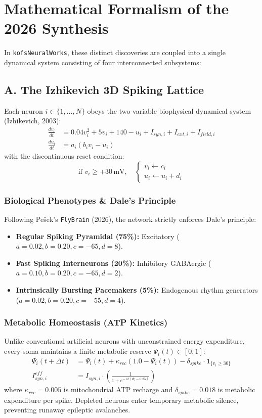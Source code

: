 \documentclass[10pt,twocolumn,a4paper]{article}
\begin{document}
\section{Mathematical Formalism of the 2026 Synthesis}

In \texttt{kofsNeuralWorks}, these distinct discoveries are coupled into a single dynamical system consisting of four interconnected subsystems:

\subsection{A. The Izhikevich 3D Spiking Lattice}
Each neuron $i \in \{1, \dots, N\}$ obeys the two-variable biophysical dynamical system (Izhikevich, 2003):
\begin{align}
\frac{dv_i}{dt} &= 0.04 v_i^2 + 5 v_i + 140 - u_i + I_{syn, i} + I_{ext, i} + I_{field, i} \\
\frac{du_i}{dt} &= a_i (b_i v_i - u_i)
\end{align}
with the discontinuous reset condition:
\begin{equation}
\text{if } v_i \ge +30\,\text{mV}, \quad \begin{cases} v_i \leftarrow c_i \\ u_i \leftarrow u_i + d_i \end{cases}
\end{equation}

\subsubsection{Biological Phenotypes \& Dale's Principle}
Following Pe\v{s}ek's \texttt{FlyBrain} (2026), the network strictly enforces Dale's principle:
\begin{itemize}
    \item \textbf{Regular Spiking Pyramidal (75\%):} Excitatory ($a=0.02, b=0.20, c=-65, d=8$).
    \item \textbf{Fast Spiking Interneurons (20\%):} Inhibitory GABAergic ($a=0.10, b=0.20, c=-65, d=2$).
    \item \textbf{Intrinsically Bursting Pacemakers (5\%):} Endogenous rhythm generators ($a=0.02, b=0.20, c=-55, d=4$).
\end{itemize}

\subsubsection{Metabolic Homeostasis (ATP Kinetics)}
Unlike conventional artificial neurons with unconstrained energy expenditure, every soma maintains a finite metabolic reserve $\Psi_i(t) \in [0, 1]$:
\begin{align}
\Psi_i(t + \Delta t) &= \Psi_i(t) + \kappa_{rec}(1.0 - \Psi_i(t)) - \delta_{spike} \cdot \mathbf{1}_{\{v_i \ge 30\}} \\
I_{syn, i}^{eff} &= I_{syn, i} \cdot \left(\frac{1}{1 + e^{-12(\Psi_i - 0.25)}}\right)
\end{align}
where $\kappa_{rec} = 0.005$ is mitochondrial ATP recharge and $\delta_{spike} = 0.018$ is metabolic expenditure per spike. Depleted neurons enter temporary metabolic silence, preventing runaway epileptic avalanches.
\end{document}
